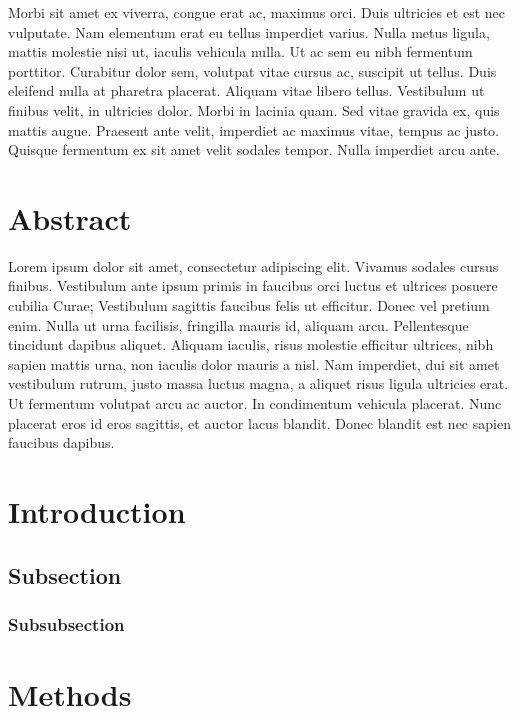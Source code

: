 \documentclass[12pt, a4paper, onepage, english,singlespacing, parskip]{scrartcl}
\begin{document}
Morbi sit amet ex viverra, congue erat ac, maximus orci. Duis ultricies et est nec vulputate. Nam elementum erat eu tellus imperdiet varius. Nulla metus ligula, mattis molestie nisi ut, iaculis vehicula nulla. Ut ac sem eu nibh fermentum porttitor. Curabitur dolor sem, volutpat vitae cursus ac, suscipit ut tellus. Duis eleifend nulla at pharetra placerat. Aliquam vitae libero tellus. Vestibulum ut finibus velit, in ultricies dolor. Morbi in lacinia quam. Sed vitae gravida ex, quis mattis augue. Praesent ante velit, imperdiet ac maximus vitae, tempus ac justo. Quisque fermentum ex sit amet velit sodales tempor. Nulla imperdiet arcu ante. 
\clearpage



\tableofcontents %
\clearpage




\section{Abstract}
Lorem ipsum dolor sit amet, consectetur adipiscing elit. Vivamus sodales cursus finibus. Vestibulum ante ipsum primis in faucibus orci luctus et ultrices posuere cubilia Curae; Vestibulum sagittis faucibus felis ut efficitur. Donec vel pretium enim. Nulla ut urna facilisis, fringilla mauris id, aliquam arcu. Pellentesque tincidunt dapibus aliquet. Aliquam iaculis, risus molestie efficitur ultrices, nibh sapien mattis urna, non iaculis dolor mauris a nisl. Nam imperdiet, dui sit amet vestibulum rutrum, justo massa luctus magna, a aliquet risus ligula ultricies erat. Ut fermentum volutpat arcu ac auctor. In condimentum vehicula placerat. Nunc placerat eros id eros sagittis, et auctor lacus blandit. Donec blandit est nec sapien faucibus dapibus.


\section{Introduction}
\subsection{Subsection}
\subsubsection{Subsubsection}



\section{Methods}
\end{document}
